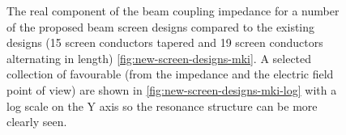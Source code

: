 \begin{figure}
\begin{center}
\end{center}
\caption{The real component of the beam coupling impedance for a number of the proposed beam screen designs compared to the existing designs (15 screen conductors tapered and 19 screen conductors alternating in length) \ref{fig:new-screen-designs-mki}. A selected collection of favourable (from the impedance and the electric field point of view) are shown in \ref{fig:new-screen-designs-mki-log} with a log scale on the Y axis so the resonance structure can be more clearly seen.}
\end{figure}


